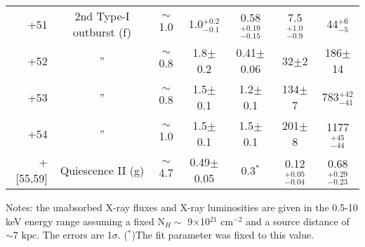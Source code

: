 \documentclass[a4paper,fleqn,usenatbib]{mnras}
\begin{document}
\begin{table*}
\begin{center}
\begin{threeparttable}
\begin{tabular}{ | r | c | c | c | c | c | c |}
		\smallskip
		+51 & 2nd Type-I outburst (f) & $\sim$1.0 & 1.0$^{+0.2}_{-0.1}$ & 0.58$^{+0.19}_{-0.15}$ & 7.5$^{+1.0}_{-0.9}$  & 44$^{+6}_{-5}$\\
		\smallskip
		+52 & '' & $\sim$0.8 & 1.8$\pm$0.2 & 0.41$\pm$0.06 & 32$\pm$2 & 186$\pm$14\\
		\smallskip	
		+53 & '' & $\sim$0.8 & 1.5$\pm$0.1 & 1.2$\pm$0.1 & 134$\pm$7 & 783$^{+42}_{-41}$\\
		\smallskip	
		+54 & '' & $\sim$1.0 & 1.5$\pm$0.1 & 1.5$\pm$0.1 & 201$\pm$8 & 1177$^{+45}_{-44}$\\
		\smallskip	
		+[55,59] & Quiescence II (g) & $\sim$4.7 & 0.49$\pm$0.05 & 0.3$^*$ & 0.12$^{+0.05}_{-0.04}$ & 0.68$^{+0.29}_{-0.23}$\\
		\hline
		\end{tabular}
	\begin{tablenotes}
	\scriptsize
	\item Notes: the unabsorbed X-ray fluxes and X-ray luminosities are given in the 0.5-10 keV energy range assuming a fixed N$_{H}\sim$ 9$\times$10$^{21}$ cm$^{-2}$ and a source distance of $\sim$7 kpc. The errors are 1$\sigma$. ($^{*}$)The fit parameter was fixed to this value.\\
	\end{tablenotes}
	\end{threeparttable}
	\end{center}
\end{table*}
\end{document}

